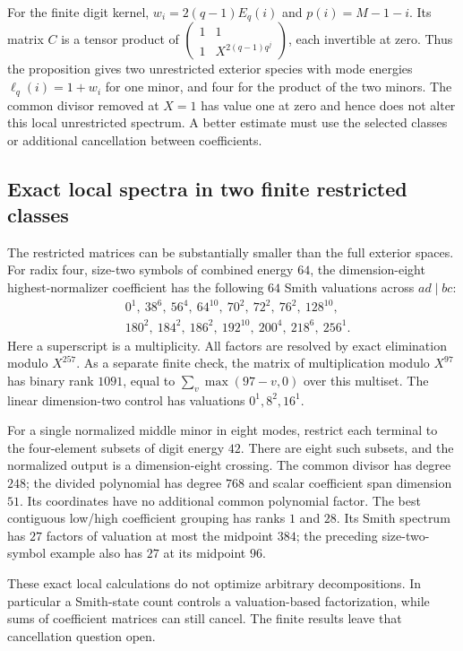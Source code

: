 For the finite digit kernel,
$w_i=2(q-1)E_q(i)$ and $p(i)=M-1-i$. Its matrix $C$ is a tensor
product of $\left(\begin{smallmatrix}1&1\\1&X^{2(q-1)q^j}
\end{smallmatrix}\right)$, each invertible at zero. Thus the
proposition gives two unrestricted exterior species with mode
energies $\ell_q(i)=1+w_i$ for one minor, and four for the product
of the two minors. The common divisor removed at $X=1$ has value
one at zero and hence does not alter this local unrestricted
spectrum. A better estimate must use the selected classes or
additional cancellation between coefficients.

\subsection{Exact local spectra in two finite restricted classes}

The restricted matrices can be substantially smaller than the
full exterior spaces. For radix four, size-two symbols of combined
energy $64$, the dimension-eight highest-normalizer coefficient
has the following $64$ Smith valuations across $ad\mid bc$:
\[
\begin{aligned}
 &0^1,\ 38^6,\ 56^4,\ 64^{10},\ 70^2,\ 72^2,\ 76^2,\ 128^{10},\\
 &180^2,\ 184^2,\ 186^2,\ 192^{10},\ 200^4,\ 218^6,\ 256^1.
\end{aligned}
\]
Here a superscript is a multiplicity. All factors are resolved by
exact elimination modulo $X^{257}$. As a separate finite check,
the matrix of multiplication modulo $X^{97}$ has binary rank
$1091$, equal to $\sum_v\max(97-v,0)$ over this multiset. The
linear dimension-two control has valuations $0^1,8^2,16^1$.

For a single normalized middle minor in eight modes, restrict each
terminal to the four-element subsets of digit energy $42$.
There are eight such subsets, and the normalized output is a
dimension-eight crossing. The common divisor has degree $248$;
the divided polynomial has degree $768$ and scalar coefficient
span dimension $51$. Its coordinates have no additional common
polynomial factor. The best contiguous low/high coefficient
grouping has ranks $1$ and $28$. Its Smith spectrum has $27$
factors of valuation at most the midpoint $384$; the preceding
size-two-symbol example also has $27$ at its midpoint $96$.

These exact local calculations do not optimize arbitrary
decompositions. In particular a Smith-state count controls a
valuation-based factorization, while sums of coefficient matrices
can still cancel. The finite results leave that cancellation
question open.
